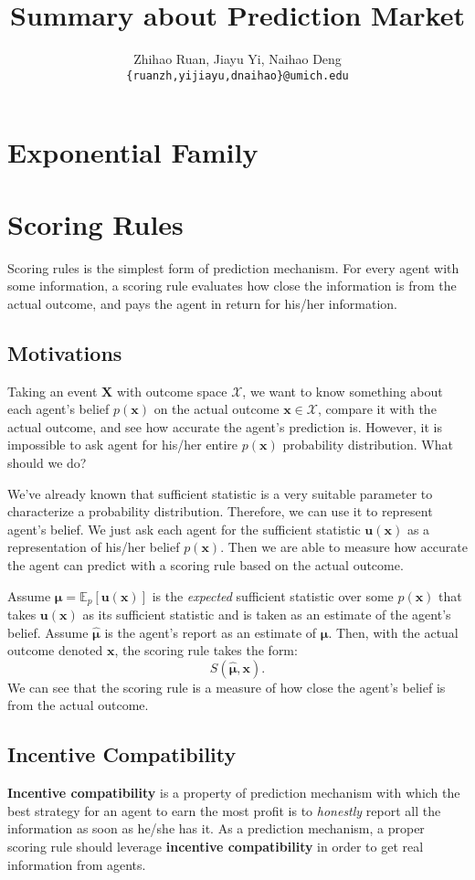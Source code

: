 \documentclass[12pt]{article}
\title{\textbf{Summary about Prediction Market}}
\author{Zhihao Ruan, Jiayu Yi, Naihao Deng\\\texttt{\{ruanzh,yijiayu,dnaihao\}@umich.edu}}
\begin{document}
\maketitle
\tableofcontents


\newpage
\section{Exponential Family}

\newpage
\section{Scoring Rules}
Scoring rules is the simplest form of prediction mechanism. For every agent with some information, a scoring rule evaluates how close the information is from the actual outcome, and pays the agent in return for his/her information.

\subsection{Motivations}
Taking an event $\mathbf{X}$ with outcome space $\mathcal{X}$, we want to know something about each agent's belief $p(\mathbf{x})$ on the actual outcome $\mathbf{x}\in \mathcal{X}$, compare it with the actual outcome, and see how accurate the agent's prediction is. However, it is impossible to ask agent for his/her entire $p(\mathbf{x})$ probability distribution. What should we do?

We've already known that sufficient statistic is a very suitable parameter to characterize a probability distribution. Therefore, we can use it to represent agent's belief. We just ask each agent for the sufficient statistic $\mathbf{u}(\mathbf{x})$ as a representation of his/her belief $p(\mathbf{x})$. Then we are able to measure how accurate the agent can predict with a scoring rule based on the actual outcome.

Assume $\bm{\mu}=\mathbb{E}_p[\mathbf{u}(\mathbf{x})]$ is the \textit{expected} sufficient statistic over some $p(\mathbf{x})$ that takes $\mathbf{u}(\mathbf{x})$ as its sufficient statistic and is taken as an estimate of the agent's belief. Assume $\bm{\hat{\mu}}$ is the agent's report as an estimate of $\bm{\mu}$. Then, with the actual outcome denoted $\mathbf{x}$, the scoring rule takes the form:
\[S(\bm{\hat{\mu}},\mathbf{x}).\]
We can see that the scoring rule is a measure of how close the agent's belief is from the actual outcome.

\subsection{Incentive Compatibility}
\textbf{Incentive compatibility} is a property of prediction mechanism with which the best strategy for an agent to earn the most profit is to \textit{honestly} report all the information as soon as he/she has it. As a prediction mechanism, a proper scoring rule should leverage \textbf{incentive compatibility} in order to get real information from agents.
\end{document}
